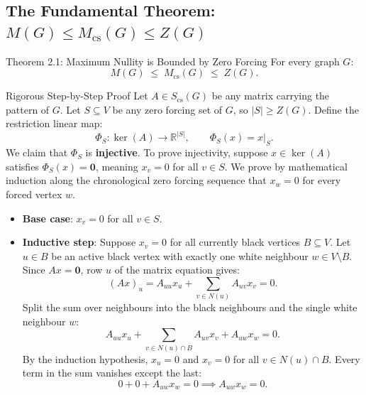 \documentclass[11pt]{article}
\begin{document}
\subsection{The Fundamental Theorem: $M(G) \le M_{\mathrm{cs}}(G) \le Z(G)$}

\begin{thmbox}{Theorem 2.1: Maximum Nullity is Bounded by Zero Forcing}
For every graph $G$:
\begin{equation}
  M(G) \;\le\; M_{\mathrm{cs}}(G) \;\le\; Z(G).
\end{equation}
\end{thmbox}

\begin{defbox}{Rigorous Step-by-Step Proof}
Let $A \in S_{\mathrm{cs}}(G)$ be any matrix carrying the pattern of $G$. Let $S \subseteq V$ be any zero forcing set of $G$, so $|S| \ge Z(G)$.
Define the restriction linear map:
\begin{equation}
  \Phi_S : \ker(A) \to \mathbb{R}^{|S|}, \qquad \Phi_S(x) = x|_S.
\end{equation}
We claim that $\Phi_S$ is \textbf{injective}.
To prove injectivity, suppose $x \in \ker(A)$ satisfies $\Phi_S(x) = \mathbf{0}$, meaning $x_v = 0$ for all $v \in S$.
We prove by mathematical induction along the chronological zero forcing sequence that $x_w = 0$ for every forced vertex $w$.
\begin{itemize}[leftmargin=*,nosep]
  \item \textbf{Base case}: $x_v = 0$ for all $v \in S$.
  \item \textbf{Inductive step}: Suppose $x_v = 0$ for all currently black vertices $B \subseteq V$. Let $u \in B$ be an active black vertex with exactly one white neighbour $w \in V \setminus B$.
  Since $Ax = \mathbf{0}$, row $u$ of the matrix equation gives:
  \begin{equation}
    (Ax)_u = A_{uu} x_u + \sum_{v \in N(u)} A_{uv} x_v = 0.
  \end{equation}
  Split the sum over neighbours into the black neighbours and the single white neighbour $w$:
  \begin{equation}
    A_{uu} x_u + \sum_{v \in N(u) \cap B} A_{uv} x_v + A_{uw} x_w = 0.
  \end{equation}
  By the induction hypothesis, $x_u = 0$ and $x_v = 0$ for all $v \in N(u) \cap B$. Every term in the sum vanishes except the last:
  \begin{equation}
    0 + 0 + A_{uw} x_w = 0 \implies A_{uw} x_w = 0.
  \end{equation}

\end{itemize}
\end{defbox}
\end{document}
